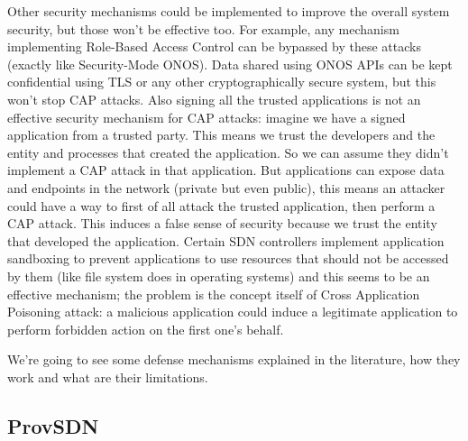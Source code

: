\documentclass[a4paper,10pt]{memoir}
\begin{document}
Other security mechanisms could be implemented to improve the overall system security, but those won't be effective too. For example, any mechanism implementing Role-Based Access Control can be bypassed by these attacks (exactly like Security-Mode ONOS). Data shared using ONOS APIs can be kept confidential using TLS or any other cryptographically secure system, but this won't stop CAP attacks. Also signing all the trusted applications is not an effective security mechanism for CAP attacks: imagine we have a signed application from a trusted party. This means we trust the developers and the entity and processes that created the application. So we can assume they didn't implement a CAP attack in that application. But applications can expose data and endpoints in the network (private but even public), this means an attacker could have a way to first of all attack the trusted application, then perform a CAP attack. This induces a false sense of security because we trust the entity that developed the application. Certain SDN controllers implement application sandboxing to prevent applications to use resources that should not be accessed by them (like file system does in operating systems) and this seems to be an effective mechanism; the problem is the concept itself of Cross Application Poisoning attack: a malicious application could induce a legitimate application to perform forbidden action on the first one's behalf.

\medskip
We're going to see some defense mechanisms explained in the literature, how they work and what are their limitations.


\subsection{ProvSDN}
\end{document}

